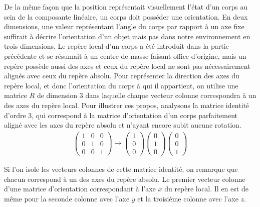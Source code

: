 De la même façon que la position représentait visuellement l'état d'un
corps au sein de la composante linéaire, un corps doit posséder une
orientation. En deux dimensions, une valeur représentant l'angle du
corps par rapport à un axe fixe suffirait à décrire l'orientation d'un
objet mais pas dans notre environnement en trois dimensions. Le repère
local d'un corps a été introduit dans la partie précédente et se
résumait à un centre de masse faisant office d'origine, mais un repère
possède aussi des axes et ceux du repère local ne sont pas
nécessairement alignés avec ceux du repère absolu. Pour représenter la
direction des axes du repère local, et donc l'orientation du corps à
qui il appartient, on utilise une matrice $R$ de dimension 3 dans
laquelle chaque vecteur colonne correspondra à un des axes du repère
local. Pour illustrer ces propos, analysons la matrice identité
d'ordre 3, qui correspond à la matrice d'orientation d'un corps
parfaitement aligné avec les axes du repère absolu et n'ayant encore
subit aucune rotation.
\begin{align*}
  \begin{pmatrix}
    1 & 0 & 0 \\ 0 & 1 & 0 \\ 0 & 0 & 1
  \end{pmatrix}
  \rightarrow
  \begin{pmatrix}
    1 \\ 0 \\ 0
  \end{pmatrix}
  \begin{pmatrix}
    0 \\ 1 \\ 0
  \end{pmatrix}
  \begin{pmatrix}
    0 \\ 0 \\ 1
  \end{pmatrix}
\end{align*}

Si l'on isole les vecteurs colonnes de cette matrice identité, on
remarque que chacun correspond à un des axes du repère absolu. Le
premier vecteur colonne d'une matrice d'orientation correspondant à
l'axe $x$ du repère local. Il en est de même pour la seconde colonne
avec l'axe $y$ et la troisième colonne avec l'axe $z$.

